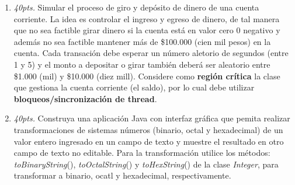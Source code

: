 \documentclass[10pt]{article}
\begin{document}
{\begin{enumerate}
		\newpage

		\item \emph{40pts.} Simular el proceso de giro y dep\'osito de dinero de una cuenta corriente. La idea es controlar el ingreso y egreso de dinero, de tal manera que no sea factible girar dinero si la cuenta est\'a en valor cero 0 negativo y adem\'as no sea factible mantener m\'as de \$100.000 (cien mil pesos) en la cuenta. Cada transaci\'on debe esperar un n\'umero aletorio de segundos (entre 1 y 5) y el monto a depositar o girar tambi\'en deber\'a ser aleatorio entre \$1.000 (mil) y \$10.000 (diez mill). Considere como \textbf{regi\'on cr\'itica} la clase que gestiona la cuenta corriente (el saldo), por lo cual debe utilizar \textbf{bloqueos/sincronizaci\'on de thread}.

		\newpage

		\item \emph{40pts.} Construya una aplicaci\'on Java con interfaz gr\'afica que pemita realizar transformaciones de sistemas n\'umeros (binario, octal y hexadecimal) de un valor entero ingresado en un campo de texto y muestre el resultado en otro campo de texto no editable. Para la transformaci\'on utilice los m\'etodos: \emph{toBinaryString}(), \emph{toOctalString}() y \emph{toHexString}() de la clase \emph{Integer}, para transformar a binario, ocatl y hexadecimal, respectivamente.

	\end{enumerate}}
\end{document}
